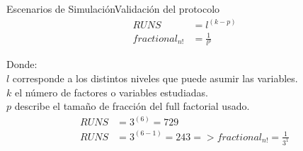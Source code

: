 \begin{frame}{Escenarios de Simulación}{Validación del protocolo}
\begin{align}
RUNS &= l^{(k-p)}  \label{eqn5}\\
fractional_{n!} &= \frac{1}{l^{p}}  \label{eqn6}
\end{align}

Donde:\\
$l$ corresponde a los distintos niveles que puede asumir las variables.\\
$k$ el número de factores o variables estudiadas.\\
$p$ describe el tamaño de fracción del full factorial usado.\\

\begin{align*}
RUNS &= 3^{(6)} = 729  \\
RUNS &= 3^{(6-1)} = 243 => fractional_{n!} = \frac{1}{3^{1}}
\end{align*}
\end{frame}
